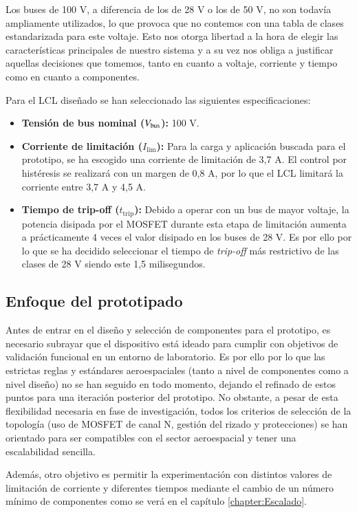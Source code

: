 \documentclass[12pt]{report} %
\begin{document}
Los buses de 100 V, a diferencia de los de 28 V o los de 50 V, no son todavía ampliamente utilizados, lo que provoca que no contemos con una tabla de clases estandarizada para este voltaje. Esto nos otorga libertad a la hora de elegir las características principales de nuestro sistema y a su vez nos obliga a justificar aquellas decisiones que tomemos, tanto en cuanto a voltaje, corriente y tiempo como en cuanto a componentes. 

Para el LCL diseñado se han seleccionado las siguientes especificaciones:
\begin{itemize}
    \item \textbf{Tensión de bus nominal ($V_{\text{bus}}$):} 100 V.
    \item \textbf{Corriente de limitación ($I_\text{lim}$):} Para la carga y aplicación buscada para el prototipo, se ha escogido una corriente de limitación de 3,7 A. El control por histéresis se realizará con un margen de 0,8 A, por lo que el LCL limitará la corriente entre 3,7 A y 4,5 A.
    \item \textbf{Tiempo de trip-off ($t_\text{trip}$):} Debido a operar con un bus de mayor voltaje, la potencia disipada por el MOSFET durante esta etapa de limitación aumenta a prácticamente 4 veces el valor disipado en los buses de 28 V. Es por ello por lo que se ha decidido seleccionar el tiempo de \textit{trip-off} más restrictivo de las clases de 28 V siendo este 1,5 milisegundos.
\end{itemize}

\subsection{Enfoque del prototipado}

Antes de entrar en el diseño y selección de componentes para el prototipo, es necesario subrayar que el dispositivo está ideado para cumplir con objetivos de validación funcional en un entorno de laboratorio. Es por ello por lo que las estrictas reglas y estándares aeroespaciales (tanto a nivel de componentes como a nivel diseño) no se han seguido en todo momento, dejando el refinado de estos puntos para una iteración posterior del prototipo. No obstante, a pesar de esta flexibilidad necesaria en fase de investigación, todos los criterios de selección de la topología (uso de MOSFET de canal N, gestión del rizado y protecciones) se han orientado para ser compatibles con el sector aeroespacial y tener una escalabilidad sencilla. 

Además, otro objetivo es permitir la experimentación con distintos valores de limitación de corriente y diferentes tiempos mediante el cambio de un número mínimo de componentes como se verá en el capítulo \ref{chapter:Escalado}.
\end{document}
